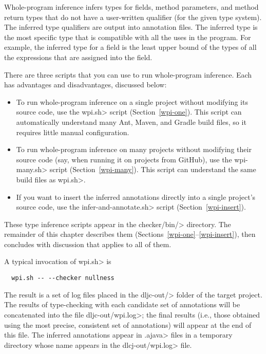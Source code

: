 
Whole-program inference
infers types for fields, method parameters, and method return types that do not
have a user-written qualifier (for the given type system).
The inferred type qualifiers are output into annotation files.
The inferred type is the most specific type that is compatible with all the
uses in the program.  For example, the inferred type for a field is the
least upper bound of the types of all the expressions that are assigned
into the field.

There are three scripts that you can use to run whole-program inference.
Each has advantages and disadvantages, discussed below:

\begin{itemize}
    \item
    To run whole-program inference on a single project without modifying its source code,
    use the \<wpi.sh> script (Section~\ref{wpi-one}). This script can automatically understand
    many Ant, Maven, and Gradle build files, so it requires little manual configuration.

    \item
    To run whole-program inference on many projects without modifying their source code
    (say, when running it on projects from GitHub), use the \<wpi-many.sh> script (Section~\ref{wpi-many}).
    This script can understand the same build files as \<wpi.sh>.

    \item
    If you want to insert the inferred annotations directly into a single
    project's source code, use the \<infer-and-annotate.sh> script (Section~\ref{wpi-insert}).
\end{itemize}

These type inference scripts appear in the \<checker/bin/> directory.
The remainder of this chapter describes them
(Sections~\ref{wpi-one}--\ref{wpi-insert}), then concludes with discussion
that applies to all of them.



A typical invocation of \<wpi.sh> is

\begin{Verbatim}
  wpi.sh -- --checker nullness
\end{Verbatim}

The result is a set of log files placed in the \<dljc-out/> folder of the
target project. The results of type-checking with each candidate set of
annotations will be concatenated into the file \<dljc-out/wpi.log>; the final
results (i.e., those obtained using the most precise, consistent set of annotations)
will appear at the end of this file.
The inferred annotations appear in \<.ajava> files in a
temporary directory whose name appears in the \<dlcj-out/wpi.log> file.

